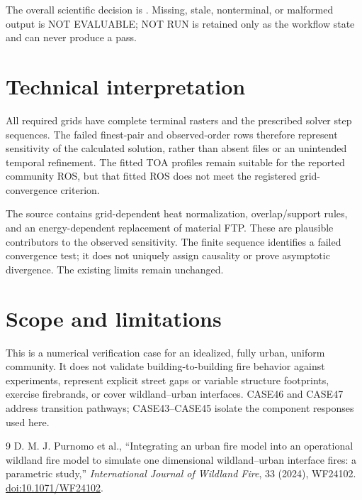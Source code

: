The overall scientific decision is \textbf{\VerificationStatus}.  Missing, stale, nonterminal, or malformed output is NOT EVALUABLE; NOT RUN is retained only as the workflow state and can never produce a pass.

\section{Technical interpretation}

All required grids have complete terminal rasters and the prescribed solver
step sequences. The failed finest-pair and observed-order rows therefore
represent sensitivity of the calculated solution, rather than absent files or
an unintended temporal refinement. The fitted TOA profiles remain suitable
for the reported community ROS, but that fitted ROS does not meet the
registered grid-convergence criterion.

The source contains grid-dependent heat normalization, overlap/support rules,
and an energy-dependent replacement of material FTP. These are plausible
contributors to the observed sensitivity. The finite sequence identifies a
failed convergence test; it does not uniquely assign causality or prove
asymptotic divergence. The existing limits remain unchanged.

\section{Scope and limitations}
This is a numerical verification case for an idealized, fully urban, uniform community. It does not validate building-to-building fire behavior against experiments, represent explicit street gaps or variable structure footprints, exercise firebrands, or cover wildland--urban interfaces. CASE46 and CASE47 address transition pathways; CASE43--CASE45 isolate the component responses used here.

\begin{thebibliography}{9}
 D. M. J. Purnomo et al., ``Integrating an urban fire model into an operational wildland fire model to simulate one dimensional wildland--urban interface fires: a parametric study,'' \emph{International Journal of Wildland Fire}, 33 (2024), WF24102. \href{https://doi.org/10.1071/WF24102}{doi:10.1071/WF24102}.
\end{thebibliography}
